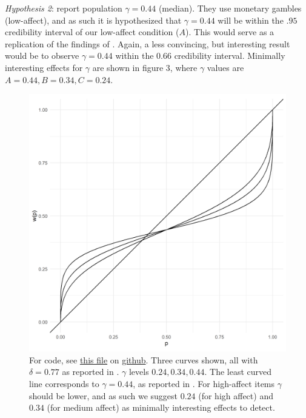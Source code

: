 \documentclass[12pt]{article}
\begin{document}
\emph{Hypothesis 2}: \textcite{gonzalez1999shape} report
population $\gamma = 0.44$ (median).
They use monetary gambles (low-affect),
and as such it is hypothesized that
$\gamma = 0.44$ will be within the  $.95$
credibility interval of our low-affect
condition ($A$). This would serve as
a replication of the findings of
\textcite{gonzalez1999shape}. Again, a
less convincing, but interesting result would
be to observe $\gamma = 0.44$ within the
 $0.66$ credibility interval. Minimally
interesting effects for $\gamma$ are
shown in figure 3, where  $\gamma$
values are  $A = 0.44, B = 0.34, C = 0.24$.

\begin{figure}[H]
	\includegraphics[width = \linewidth]{../Figures/ourHyp.png}
	\caption{For code, see
		\href{https://github.com/victor-m-p/BayesianDecisionWeights/blob/main/Code/0_visualize_parameters.Rmd}
		{this file} on
		\href{https://github.com/victor-m-p/BayesianDecisionWeights}{github}.
		Three curves shown, all with $\delta = 0.77$
	as reported in \textcite{gonzalez1999shape}.
	$\gamma$ levels $0.24, 0.34, 0.44$. The
	least curved line corresponds to $\gamma = 0.44$,
	as reported in \textcite{gonzalez1999shape}.
	For high-affect items $\gamma$ should
	be lower, and as such we suggest $0.24$
	(for high affect) and  $0.34$ (for medium
	affect) as minimally interesting effects
to detect.}
\end{figure}
\end{document}
